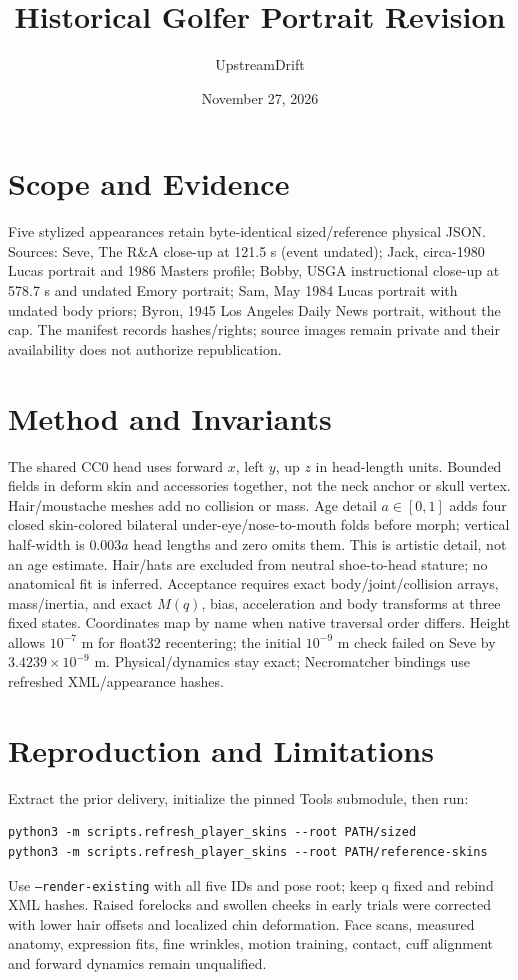 \documentclass{article}
\title{Historical Golfer Portrait Revision}
\author{UpstreamDrift}
\date{November 27, 2026}
\begin{document}
\maketitle
\section{Scope and Evidence}
Five stylized appearances retain byte-identical sized/reference physical JSON.
Sources: Seve, The R\&A close-up at 121.5 s (event undated); Jack, circa-1980 Lucas portrait and 1986 Masters profile;
Bobby, USGA instructional close-up at 578.7 s and undated Emory portrait; Sam,
May 1984 Lucas portrait with undated body priors; Byron, 1945 Los Angeles Daily
News portrait, without the cap. The manifest records hashes/rights; source images
remain private and their availability does not authorize republication.
\section{Method and Invariants}
The shared CC0 head uses forward $x$, left $y$, up $z$ in head-length units.
Bounded fields in  deform skin and accessories together, not the
neck anchor or skull vertex. Hair/moustache meshes add no collision or mass.
Age detail $a\in[0,1]$ adds four closed skin-colored bilateral under-eye/nose-to-mouth folds
before morph; vertical half-width is $0.003a$ head lengths and zero omits them.
This is artistic detail, not an age estimate. Hair/hats are excluded from neutral
shoe-to-head stature; no anatomical fit is inferred.
Acceptance requires exact body/joint/collision arrays, mass/inertia, and exact
$M(q)$, bias, acceleration and body transforms at three fixed states. Coordinates
map by name when native traversal order differs. Height allows $10^{-7}$ m for
float32 recentering; the initial $10^{-9}$ m check failed on Seve by
$3.4239\times10^{-9}$ m. Physical/dynamics stay exact; Necromatcher bindings
use refreshed XML/appearance hashes.
\section{Reproduction and Limitations}
Extract the prior delivery, initialize the pinned Tools submodule, then run:
\begin{verbatim}
python3 -m scripts.refresh_player_skins --root PATH/sized
python3 -m scripts.refresh_player_skins --root PATH/reference-skins
\end{verbatim}
Use \texttt{--render-existing} with all five IDs and pose root; keep q fixed and rebind XML hashes.
Raised forelocks and swollen cheeks in early trials were corrected with lower hair
offsets and localized chin deformation. Face scans, measured anatomy, expression fits,
fine wrinkles, motion training, contact, cuff alignment and forward dynamics remain unqualified.
\end{document}
